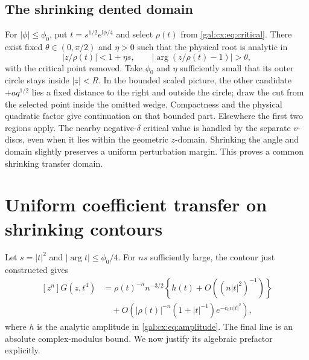 \documentclass[11pt,letterpaper]{article}
\numberwithin{equation}{section}
\theoremstyle{definition}\newtheorem{definition}[theorem]{Definition}
\theoremstyle{remark}\newtheorem{remark}[theorem]{Remark}
\newcommand{\ii}{\mathrm i}
\begin{document}
\subsection{The shrinking dented domain}
For $|\phi|\le\phi_0$, put $t=s^{1/2}e^{\ii\phi/4}$ and select $\rho(t)$ from \eqref{gal:cx:eq:critical}. There exist fixed $\theta\in(0,\pi/2)$ and $\eta>0$ such that the physical root is analytic in
\begin{equation}\label{gal:cx:eq:delta-domain}
|z/\rho(t)|<1+\eta s,\qquad
|\arg(z/\rho(t)-1)|>\theta,
\end{equation}
with the critical point removed. Take $\phi_0$ and $\eta$ sufficiently small that its outer circle stays inside $|z|<R$. In the bounded scaled picture, the other candidate $+aq^{1/2}$ lies a fixed distance to the right and outside the circle; draw the cut from the selected point inside the omitted wedge. Compactness and the physical quadratic factor give continuation on that bounded part. Elsewhere the first two regions apply. The nearby negative-$\delta$ critical value is handled by the separate $v$-discs, even when it lies within the geometric $z$-domain. Shrinking the angle and domain slightly preserves a uniform perturbation margin. This proves a common shrinking transfer domain.

\section{Uniform coefficient transfer on shrinking contours}
Let $s=|t|^2$ and $|\arg t|\le\phi_0/4$. For $ns$ sufficiently large, the contour just constructed gives
\begin{equation}\label{gal:cx:eq:transfer}
\begin{aligned}
[z^n]G(z,t^4)
&=\rho(t)^{-n}n^{-3/2}
\left\{h(t)+O((n|t|^2)^{-1})\right\}\\
&\quad+O\!\left(|\rho(t)|^{-n}(1+|t|^{-1})
 e^{-c_0n|t|^2}\right),
\end{aligned}
\end{equation}
where $h$ is the analytic amplitude in \eqref{gal:cx:eq:amplitude}. The final line is an absolute complex-modulus bound. We now justify its algebraic prefactor explicitly.
\end{document}

